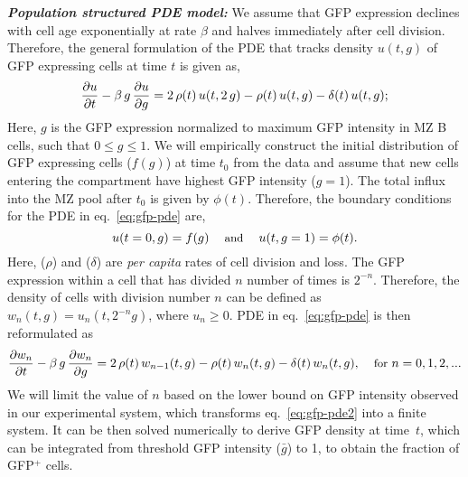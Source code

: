 \documentclass[11pt]{article}
\begin{document}
\textbf{\textit{Population structured PDE model:}}
We assume that GFP expression declines with cell age exponentially at rate $\beta$ and halves immediately after cell division.
Therefore, the general formulation of the PDE that tracks density $u(t, g)$  of GFP expressing cells at time $t$ is given as,
\begin{equation}
\small
\frac{\partial u}{\partial t}  - \beta \,g \, \frac{\partial u}{\partial g} = 2\,  \rho(t)  \, u(t, 2\,g) - \rho(t) \, u(t, g) - \delta(t)  \, u(t, g);
\label{eq:gfp-pde}
\end{equation}
Here, $g$ is the GFP expression normalized to maximum GFP intensity in MZ B cells, such that $0 \le g \le 1$. 
We will empirically construct the initial distribution of GFP expressing cells ($f(g)$) at time $t_{0}$ from the data and
assume that new cells entering the compartment have highest GFP intensity ($g=1$).
The total influx into the MZ pool after $t_0$ is given by $\phi(t)$.
Therefore, the boundary conditions for the PDE in eq.~\ref{eq:gfp-pde} are, 
\begin{equation*}
\small
u(t=0, g) = f(g) \quad \text{ and } \quad u(t, g=1) = \phi(t).
\end{equation*}
Here, ($\rho$) and ($\delta$) are \textit{per capita} rates of cell division and loss. %
The GFP expression within a cell that has divided $n$ number of times is $2^{-n}$. 
Therefore, the density of cells with division number $n$ can be defined as $w_{n}(t, g) = u_{n}(t, 2^{-n} g)$, where $u_{n} \ge 0$. %
PDE in eq.~\ref{eq:gfp-pde} is then reformulated as
\begin{equation} 
\small
\frac{\partial w_{n}}{\partial t}  - \beta \,g \, \frac{\partial w_{n}}{\partial g} = 2\, \rho(t)  \, w_{n-1}(t, g) - \rho(t) \, w_{n}(t, g)  - \delta(t)  \, w_{n}(t, g), \quad \, \text{for } n = 0, 1, 2, ...
\label{eq:gfp-pde2}
\end{equation}
We will limit the value of $n$ based on the lower bound on GFP intensity observed in our experimental system, which transforms {eq.~\ref{eq:gfp-pde2}} into a finite system.
It can be then solved numerically to derive GFP density at time~$t$, which can be integrated from threshold GFP intensity ($\bar{g}$) to 1, to obtain the fraction of GFP$^{+}$ cells. 
\end{document}
